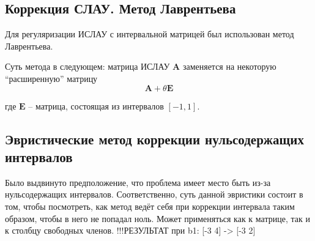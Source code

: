 \subsection{Коррекция СЛАУ. Метод Лаврентьева}

Для регуляризации ИСЛАУ с интервальной матрицей был использован метод Лаврентьева.

Суть метода в следующем: матрица ИСЛАУ $\mathbf{A}$ заменяется на некоторую ``расширенную'' матрицу 
\begin{equation}
\mathbf{A} + \theta \mathbf{E}
\end{equation}

где $\mathbf{E}$ -- матрица, состоящая из интервалов $[-1, 1]$.

\subsection{Эвристические метод коррекции нульсодержащих интервалов}

Было выдвинуто предположение, что проблема имеет место быть из-за нульсодержащих интервалов. Соответственно, суть данной эвристики состоит в том, чтобы посмотреть, как метод ведёт себя при коррекции интервала таким образом, чтобы в него не попадал ноль. Может применяться как к матрице, так и к столбцу свободных членов.
!!!РЕЗУЛЬТАТ при b1: [-3 4] -> [-3 2]